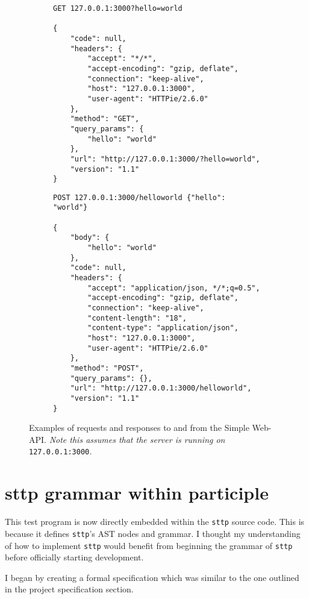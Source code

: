 \begin{figure}[H]
    \centering
    \begin{subfigure}{.5\textwidth}
        \centering
        \begin{mdframed}
            \begin{Verbatim}[fontsize=\scriptsize]
GET 127.0.0.1:3000?hello=world

{
    "code": null,
    "headers": {
        "accept": "*/*",
        "accept-encoding": "gzip, deflate",
        "connection": "keep-alive",
        "host": "127.0.0.1:3000",
        "user-agent": "HTTPie/2.6.0"
    },
    "method": "GET",
    "query_params": {
        "hello": "world"
    },
    "url": "http://127.0.0.1:3000/?hello=world",
    "version": "1.1"
}
            \end{Verbatim}
        \end{mdframed}
    \end{subfigure}%
    \begin{subfigure}{.5\textwidth}
        \centering
        \begin{mdframed}            
            \begin{Verbatim}[fontsize=\scriptsize]
POST 127.0.0.1:3000/helloworld {"hello": "world"}

{
    "body": {
        "hello": "world"
    },
    "code": null,
    "headers": {
        "accept": "application/json, */*;q=0.5",
        "accept-encoding": "gzip, deflate",
        "connection": "keep-alive",
        "content-length": "18",
        "content-type": "application/json",
        "host": "127.0.0.1:3000",
        "user-agent": "HTTPie/2.6.0"
    },
    "method": "POST",
    "query_params": {},
    "url": "http://127.0.0.1:3000/helloworld",
    "version": "1.1"
}
            \end{Verbatim}
        \end{mdframed}
    \end{subfigure}
    \cprotect\caption{\label{fig:1.2}Examples of requests and responses to and from the Simple Web-API. \textit{Note this assumes that the server is running on }\verb|127.0.0.1:3000|\textit{.}}
\end{figure}

\section{sttp grammar within participle}

This test program is now directly embedded within the \verb|sttp| source code. This is because it defines \verb|sttp|'s AST nodes and grammar. I thought my understanding of how to implement \verb|sttp| would benefit from beginning the grammar of \verb|sttp| before officially starting development.

I began by creating a formal specification which was similar to the one outlined in the project specification section.
